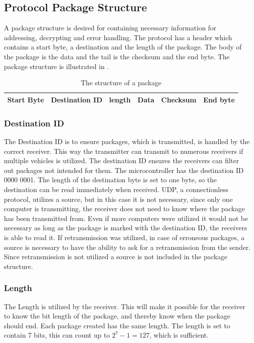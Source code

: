 \subsection{Protocol Package Structure}
A package structure is desired for containing necessary information for addressing, decrypting and error handling. The protocol has a header which contains a start byte, a destination and the length of the package. The body of the package is the data and the tail is the checksum and the end byte. The package structure is illustrated in .

\begin{table}[H]\centering
\begin{tabular}{|>{\centering\arraybackslash}m{2cm}|>{\centering\arraybackslash}m{3cm}|>{\centering\arraybackslash}m{2cm}|>{\centering\arraybackslash}m{2cm}|>{\centering\arraybackslash}m{2cm}|>{\centering\arraybackslash}m{2cm}|}
\hline
Start Byte & Destination ID & length & Data & Checksum & End byte \\
\hline
\end{tabular}
\caption{The structure of a package}
\label{CoorSetup}
\end{table}

\subsubsection{Destination ID}
The Destination ID is to ensure packages, which is transmitted, is handled by the correct receiver. This way the transmitter can transmit to numerous receivers if multiple vehicles is utilized. The destination ID ensures the receivers can filter out packages not intended for them. The microcontroller has the destination ID 0000 0001. The length of the destination byte is set to one byte, so the destination can be read immediately when received.
\newpage
UDP, a connectionless protocol, utilizes a source, but in this case it is not necessary, since only one computer is transmitting, the receiver does not need to know where the package has been transmitted from. Even if more computers were utilized it would not be necessary as long as the package is marked with the destination ID, the receivers is able to read it. If retransmission was utilized, in case of erroneous packages, a source is necessary to have the ability to ask for a retransmission from the sender. Since retransmission is not utilized a source is not included in the package structure.

\subsubsection{Length}
The Length is utilized by the receiver. This will make it possible for the receiver to know the bit length of the package, and thereby know when the package should end. Each package created has the same length. The length is set to contain 7 bits, this can count up to $2^{7}-1 = 127$, which is sufficient.

